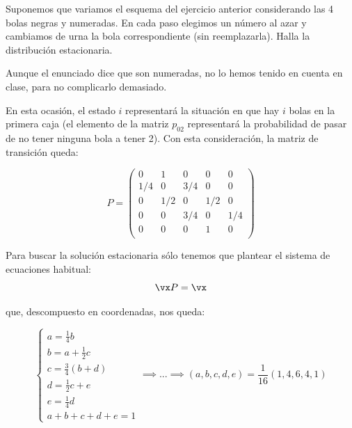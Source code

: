 \begin{problem}[10]
Suponemos que variamos el esquema del ejercicio anterior considerando las 4 bolas negras y numeradas. En cada paso elegimos un número al azar y cambiamos de urna la bola correspondiente (sin reemplazarla). Halla la distribución estacionaria.
	\solution

	Aunque el enunciado dice que son numeradas, no lo hemos tenido en cuenta en clase, para no complicarlo demasiado.

	En esta ocasión, el estado $i$ representará la situación en que hay $i$ bolas en la primera caja (el elemento de la matriz $p_{02}$ representará la probabilidad de pasar de no tener ninguna bola a tener 2). Con esta consideración, la matriz de transición queda:

	\[P= \left( \begin{matrix}
	0&1&0&0&0\\
	1/4&0&3/4&0&0\\
	0&1/2&0&1/2&0\\
	0&0&3/4&0&1/4\\
	0&0&0&1&0\\
	\end{matrix}\right)\]

	Para buscar la solución estacionaria sólo tenemos que plantear el sistema de ecuaciones habitual:
	\[\vx P = \vx\]

	que, descompuesto en coordenadas, nos queda:

	\[\begin{cases}
		 a=\frac{1}{4}b\\
		 b= a+\frac{1}{2}c\\
		 c= \frac{3}{4} \left(b+d\right)\\
		 d= \frac{1}{2}c+e\\
		 e= \frac{1}{4}d\\
		 a+b+c+d+e=1
	\end{cases} \implies ... \implies (a,b,c,d,e) = \frac{1}{16} (1,4,6,4,1)\]


\end{problem}

